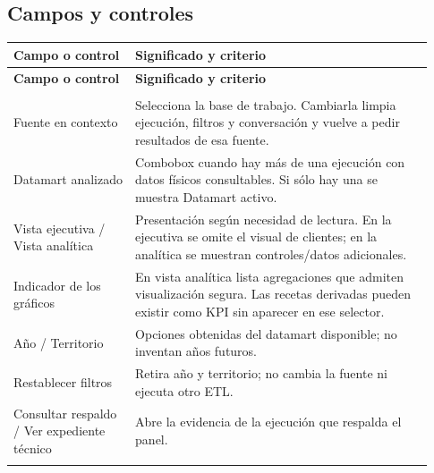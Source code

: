 \subsection{Campos y controles}
\begingroup
\fontsize{10}{12.5}\selectfont
\setlength{\tabcolsep}{5pt}
\renewcommand{\arraystretch}{1.15}
\begin{longtable}{@{}>{\RaggedRight\arraybackslash}p{0.27\linewidth}>{\RaggedRight\arraybackslash}p{0.66\linewidth}@{}}
\toprule
\textbf{Campo o control} & \textbf{Significado y criterio} \\
\midrule
\endfirsthead
\toprule
\textbf{Campo o control} & \textbf{Significado y criterio} \\
\midrule
\endhead
\midrule
\multicolumn{2}{r}{\footnotesize Continúa en la página siguiente}\\
\endfoot
\bottomrule
\endlastfoot
Fuente en contexto & Selecciona la base de trabajo. Cambiarla limpia ejecución, filtros y conversación y vuelve a pedir resultados de esa fuente. \\
\addlinespace[3pt]
Datamart analizado & Combobox cuando hay más de una ejecución con datos físicos consultables. Si sólo hay una se muestra Datamart activo. \\
\addlinespace[3pt]
Vista ejecutiva / Vista analítica & Presentación según necesidad de lectura. En la ejecutiva se omite el visual de clientes; en la analítica se muestran controles/datos adicionales. \\
\addlinespace[3pt]
Indicador de los gráficos & En vista analítica lista agregaciones que admiten visualización segura. Las recetas derivadas pueden existir como KPI sin aparecer en ese selector. \\
\addlinespace[3pt]
Año / Territorio & Opciones obtenidas del datamart disponible; no inventan años futuros. \\
\addlinespace[3pt]
Restablecer filtros & Retira año y territorio; no cambia la fuente ni ejecuta otro ETL. \\
\addlinespace[3pt]
Consultar respaldo / Ver expediente técnico & Abre la evidencia de la ejecución que respalda el panel. \\
\addlinespace[3pt]
\end{longtable}
\endgroup

